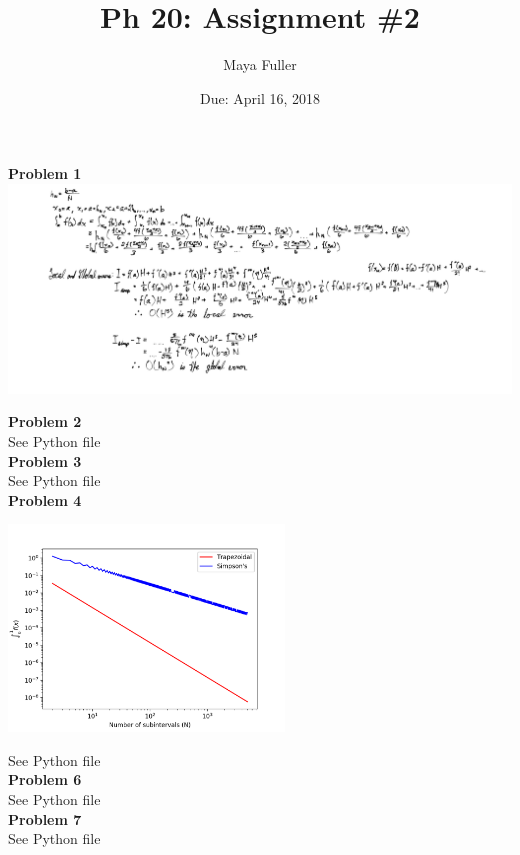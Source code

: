 \documentclass[12pt]{article}
\title{Ph 20: Assignment \#2}
\author{Maya Fuller}
\date{Due: April 16, 2018} %
\begin{document}
	
	
	\maketitle

	\noindent\textbf{\large Problem 1}\\
		\includegraphics[width=\textwidth]{derivation.png}
	
	\noindent\textbf{\large Problem 2}\\
		See Python file\\
	\noindent\textbf{\large Problem 3}\\
		See Python file \\
	\noindent\textbf{\large Problem 4}
		\begin{center}
				\includegraphics[width=0.55\textwidth]{prob4.png}
		\end{center}		
		See Python file\\
	\noindent\textbf{\large Problem 6}\\
		See Python file\\
	\noindent\textbf{\large Problem 7}\\
		See Python file
			
		
\end{document}
